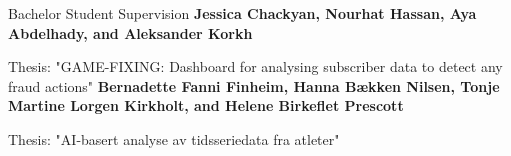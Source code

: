 \begin{rubric}{Bachelor Student Supervision}
    \entry*[2023]%
    \textbf{Jessica Chackyan, Nourhat Hassan, Aya Abdelhady, and Aleksander Korkh} \par
    Thesis: "GAME-FIXING: Dashboard for analysing subscriber data to detect any fraud actions"
    \entry*[2022]%
    \textbf{Bernadette Fanni Finheim, Hanna Bækken Nilsen, Tonje Martine Lorgen Kirkholt, and Helene Birkeflet Prescott} \par
    Thesis: "AI-basert analyse av tidsseriedata fra atleter"
\end{rubric}